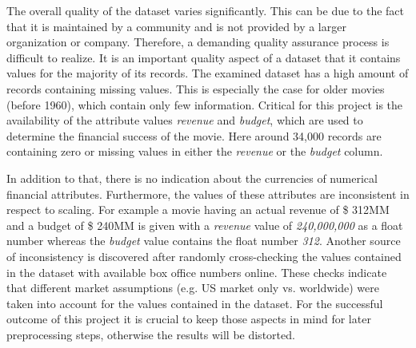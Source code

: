 The overall quality of the dataset varies significantly. This can be due to the fact that it is maintained by a community and is not provided by a larger organization or company. Therefore, a demanding quality assurance process is difficult to realize. It is an important quality aspect of a dataset that it contains values for the majority of its records. The examined dataset has a high amount of records containing missing values. This is especially the case for older movies (before 1960), which contain only few information. Critical for this project is the availability of the attribute values \textit{revenue} and \textit{budget}, which are used to determine the financial success of the movie. Here around 34,000 records are containing zero or missing values in either the \textit{revenue} or the \textit{budget} column.

In addition to that, there is no indication about the currencies of numerical financial attributes. Furthermore, the values of these attributes are inconsistent in respect to scaling. For example a movie having an actual revenue of \$ 312MM and a budget of \$ 240MM is given with a \textit{revenue} value of \textit{240,000,000} as a float number whereas the \textit{budget} value contains the float number \textit{312}. Another source of inconsistency is discovered after randomly cross-checking the values contained in the dataset with available box office numbers online. These checks indicate that different market assumptions (e.g. US market only vs. worldwide) were taken into account for the values contained in the dataset. For the successful outcome of this project it is crucial to keep those aspects in mind for later preprocessing steps, otherwise the results will be distorted.

